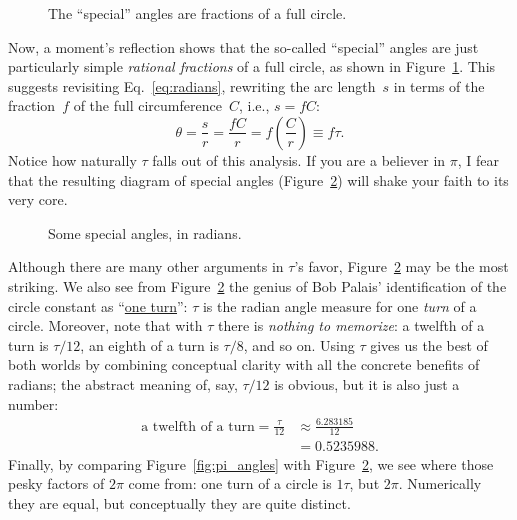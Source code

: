 \begin{figure}
\begin{center}
\end{center}
\caption{The ``special'' angles are fractions of a full circle.\label{fig:angle_fractions}}
\end{figure}

Now, a moment's reflection shows that the so-called ``special'' angles are just particularly simple \emph{rational fractions} of a full circle, as shown in Figure~\ref{fig:angle_fractions}. This suggests revisiting Eq.~\eqref{eq:radians}, rewriting the arc length~$s$ in terms of the fraction~$f$ of the full circumference~$C$, i.e., $s = f C$:
\[ \theta = \frac{s}{r} = \frac{fC}{r} =  f\left(\frac{C}{r}\right) \equiv f\tau. \]
 Notice how naturally $\tau$ falls out of this analysis. If you are a believer in $\pi$, I fear that the resulting diagram of special angles (Figure~\ref{fig:tau_angles}) will shake your faith to its very core.

\begin{figure}
\begin{center}
\end{center}
\caption{Some special angles, in radians.\label{fig:tau_angles}}
\end{figure}

Although there are many other arguments in $\tau$'s favor, Figure~\ref{fig:tau_angles} may be the most striking. We also see from Figure~\ref{fig:tau_angles} the genius of Bob Palais' identification of the circle constant as ``\href{https://en.wikipedia.org/wiki/Turn_(geometry)}{one turn}'': $\tau$ is the radian angle measure for one \emph{turn} of a circle. Moreover, note that with $\tau$ there is \emph{nothing to memorize}: a twelfth of a turn is $\tau/12$, an eighth of a turn is $\tau/8$, and so on. Using $\tau$ gives us the best of both worlds by combining conceptual clarity with all the concrete benefits of radians; the abstract meaning of, say, $\tau/12$ is obvious, but it is also just a number:
\[
\begin{split}
\mbox{a twelfth of a turn} = \frac{\tau}{12} & \approx \frac{6.283185}{12} \\
                                             & = 0.5235988.
\end{split}
\]
Finally, by comparing Figure~\ref{fig:pi_angles} with Figure~\ref{fig:tau_angles}, we see where those pesky factors of $2\pi$ come from: one turn of a circle is $1\tau$, but $2\pi$. Numerically they are equal, but conceptually they are quite distinct.


